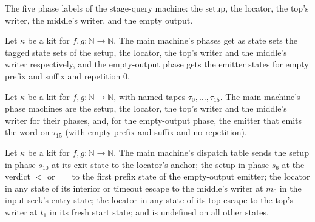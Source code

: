 \begin{definition}
\label{Turing.NTimeDiag.QyMain}
\leanok
The five phase labels of the stage-query machine: the setup, the locator, the top's writer, the
middle's writer, and the empty output.
\end{definition}

\begin{definition}
\label{Turing.NTimeDiag.QyMainPh}
\leanok
{}
Let $\kappa$ be a kit for $f, g : \mathbb{N} \to \mathbb{N}$. The main machine's phases get as state
sets the tagged state sets of the setup, the locator, the top's writer and the middle's writer
respectively, and the empty-output phase gets the emitter states for empty prefix and suffix and
repetition $0$.
\end{definition}

\begin{definition}
\label{Turing.NTimeDiag.qyMainM}
\leanok
{}
Let $\kappa$ be a kit for $f, g : \mathbb{N} \to \mathbb{N}$, with named tapes $\tau_0, \dots,
\tau_{15}$. The main machine's phase machines are the setup, the locator, the top's writer and the
middle's writer for their phases, and, for the empty-output phase, the emitter that emits the
word on $\tau_{15}$ (with empty prefix and suffix and no repetition).
\end{definition}

\begin{definition}
\label{Turing.NTimeDiag.qyMainRed}
\leanok
{}
Let $\kappa$ be a kit for $f, g : \mathbb{N} \to \mathbb{N}$. The main machine's dispatch table
sends the setup in phase $s_{10}$ at its exit state to the locator's anchor; the setup in phase
$s_6$ at the verdict $<$ or $=$ to the first prefix state of the empty-output emitter; the locator
in any state of its interior or timeout escape to the middle's writer at $m_0$ in the input seek's
entry state; the locator in any state of its top escape to the top's writer at $t_1$ in its fresh
start state; and is undefined on all other states.
\end{definition}

